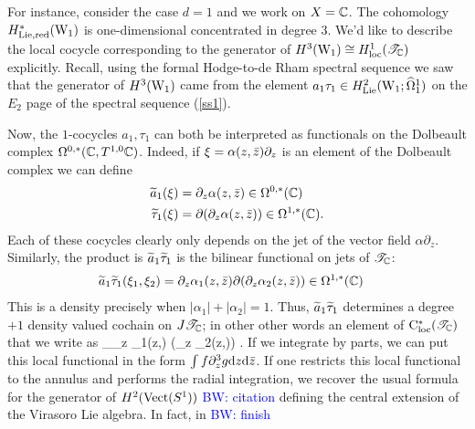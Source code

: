 \documentclass[10pt]{amsart}
\def\brian{\textcolor{blue}{BW: }\textcolor{blue}}
\begin{document}
For instance, consider the case $d=1$ and we work on $X = \CC$. 
The cohomology $H^*_{\rm Lie, red}(\W_1)$ is one-dimensional concentrated in degree $3$. 
We'd like to describe the local cocycle corresponding to the generator of $H^3(\W_1) \cong H^1_{\rm loc}(\sT_{\CC})$ explicitly. 
Recall, using the formal Hodge-to-de Rham spectral sequence we saw that the generator of $H^3(\W_1)$ came from the element $a_1 \tau_1 \in H^2_{\rm Lie} (\W_1 ; \hOmega^1_1)$ on the $E_2$ page of the spectral sequence (\ref{ss1}). 

Now, the $1$-cocycles $a_1,\tau_1$ can both be interpreted as functionals on the Dolbeault complex $\Omega^{0,*}(\CC, T^{1,0}\CC)$. 
Indeed, if $\xi = \alpha(z,\zbar) \partial_z$ is an element of the Dolbeault complex we can define
\begin{align*}
\Tilde{a}_1 (\xi) & = \partial_z \alpha(z,\zbar) \in \Omega^{0,*}(\CC) \\
\Tilde{\tau}_1 (\xi) & = \partial (\partial_z \alpha(z,\zbar)) \in \Omega^{1,*}(\CC) .
\end{align*}
Each of these cocycles clearly only depends on the jet of the vector field $\alpha \partial_z$.
Similarly, the product is $\Tilde{a}_1 \Tilde{\tau}_1$ is the bilinear functional on jets of $\sT_\CC$:
\begin{align*}
\Tilde{a}_1 \Tilde{\tau}_1 (\xi_1,\xi_2) & = \partial_z \alpha_1(z,\zbar)  \partial (\partial_z \alpha_2(z,\zbar)) \in \Omega^{1,*}(\CC)
\end{align*}
This is a density precisely when $|\alpha_1|+|\alpha_2| = 1$.
Thus, $\Tilde{a}_1 \Tilde{\tau}_1$ determines a degree $+1$ density valued cochain on $J \sT_\CC$; in other other words an element of $\cloc^*(\sT_\CC)$ that we write as
\ben
\int_\CC \partial_z \alpha_1(z,\zbar)  \partial (\partial_z \alpha_2(z,\zbar)) .
\een
If we integrate by parts, we can put this local functional in the form $\int f \partial^3_z g \d z \d \zbar$. 
If one restricts this local functional to the annulus and performs the radial integration, we recover the usual formula for the generator of $H^2({\rm Vect}(S^1))$ \brian{citation} defining the central extension of the Virasoro Lie algebra. 
In fact, in \cite{BWVir} \brian{finish}



\end{document}
